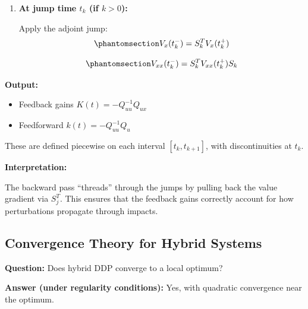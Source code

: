 \documentclass[
  letterpaper,
  DIV=11,
  numbers=noendperiod]{scrartcl}
\providecommand{\tightlist}{%
  \setlength{\itemsep}{0pt}\setlength{\parskip}{0pt}}\usepackage{longtable,booktabs,array}
\begin{document}
\begin{tcolorbox}
\begin{enumerate}
  where \(Q_{uu}, Q_{ux}, Q_{xu}\) come from the Hamiltonian second
  derivatives (standard DDP).
\item
  \textbf{At jump time \(t_k\) (if \(k > 0\)):}

  Apply the adjoint jump:
  \begin{equation}\phantomsection\label{eq-adjoint-jump-backward}{
  V_x(t_k^-) = S_k^T V_x(t_k^+)
  }\end{equation}

  \begin{equation}\phantomsection\label{eq-hessian-jump-backward}{
  V_{xx}(t_k^-) = S_k^T V_{xx}(t_k^+) S_k
  }\end{equation}
\end{enumerate}

\textbf{Output:}

\begin{itemize}
\tightlist
\item
  Feedback gains \(K(t) = -Q_{uu}^{-1} Q_{ux}\)
\item
  Feedforward \(k(t) = -Q_{uu}^{-1} Q_u\)
\end{itemize}

These are defined piecewise on each interval \([t_k, t_{k+1}]\), with
discontinuities at \(t_k\).

\end{tcolorbox}

\textbf{Interpretation:}

The backward pass ``threads'' through the jumps by pulling back the
value gradient via \(S_j^T\). This ensures that the feedback gains
correctly account for how perturbations propagate through impacts.

\subsection{Convergence Theory for Hybrid
Systems}\label{convergence-theory-for-hybrid-systems}

\textbf{Question:} Does hybrid DDP converge to a local optimum?

\textbf{Answer (under regularity conditions):} Yes, with quadratic
convergence near the optimum.
\end{document}
